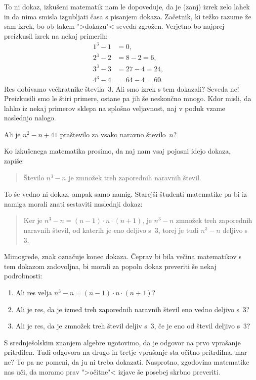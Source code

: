 \noindent
To ni dokaz, izkušeni matematik nam le dopoveduje, da je (zanj) izrek
zelo lahek in da nima smisla izgubljati časa s pisanjem dokaza.
Začetnik, ki težko razume že sam izrek, bo ob takem ">dokazu"< seveda
zgrožen. Verjetno bo najprej preizkusil izrek na nekaj primerih:
%
\begin{align*}
  1^3 - 1 &= 0,\\
  2^3 - 2 &= 8 - 2 = 6,\\
  3^3 - 3 &= 27 - 4 = 24,\\
  4^3 - 4 &= 64 - 4 = 60.
\end{align*}
%
Res dobivamo večkratnike števila~$3$. Ali smo izrek s tem dokazali? Seveda ne!
Preizkusili smo le štiri primere, ostane pa jih še neskončno mnogo. Kdor
misli, da lahko iz nekaj primerov sklepa na splošno veljavnost, naj v poduk
vzame naslednjo nalogo.

\begin{naloga}
  Ali je $n^2 - n + 41$ praštevilo za vsako naravno število~$n$?
\end{naloga}

\noindent
Ko izkušenega matematika prosimo, da naj nam vsaj pojasni idejo dokaza,
zapiše:

\begin{quote}
  \begin{dokaz}
    Število $n^3 - n$ je zmnožek treh zaporednih naravnih števil.
  \end{dokaz}
\end{quote}

\noindent
To še vedno ni dokaz, ampak samo namig. Starejši študenti matematike pa
bi iz namiga morali znati sestaviti naslednji dokaz:

\begin{quote}
  \begin{dokaz}
    Ker je $n^3 - n = (n-1) \cdot n \cdot (n+1)$, je $n^3 - n$ zmnožek
    treh zaporednih naravnih števil, od katerih je eno deljivo s~$3$,
    torej je tudi $n^3 - n$ deljivo s~$3$.
  \end{dokaz}
\end{quote}

\noindent
Mimogrede, znak {\;\qedsign\;} označuje konec dokaza. Čeprav bi bila
večina matematikov s tem dokazom zadovoljna, bi morali za popoln dokaz
preveriti še nekaj podrobnosti:
%
\begin{enumerate}
\item Ali res velja $n^3 - n = (n-1) \cdot n \cdot (n+1)$?
\item Ali je res, da je izmed treh zaporednih naravnih števil eno
  vedno deljivo s~$3$?
\item Ali je res, da je zmnožek treh števil deljiv s~$3$, če je eno od
  števil deljivo s~$3$?
\end{enumerate}
%
S srednješolskim znanjem algebre ugotovimo, da je odgovor na prvo
vprašanje pritrdilen. Tudi odgovora na drugo in tretje vprašanje sta
očitno pritrdilna, mar ne? To pa ne pomeni, da ju ni treba dokazati.
Nasprotno, zgodovina matematike nas uči, da moramo prav ">očitne"<
izjave še posebej skrbno preveriti.

